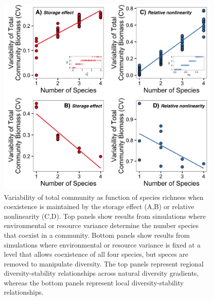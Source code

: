 \documentclass[12pt,]{article}
\begin{document}
\begin{figure}[!ht]
  \centering
      \includegraphics{./components/main_figure_hires.png}
  \caption{Variability of total community as function of species richness when coexistence is maintained by the storage effect (A,B) or relative nonlinearity (C,D). Top panels show results from simulations where environmental or resource variance determine the number species that coexist in a community. Bottom panels show results from simulations where environmental or resource variance is fixed at a level that allows coexistence of all four species, but speces are removed to manipulate diversity. The top panels represent regional diversity-stability relationships across natural diversity gradients, whereas the bottom panels represent local diversity-stability relationships.}
\end{figure}

\newpage{}
\end{document}
